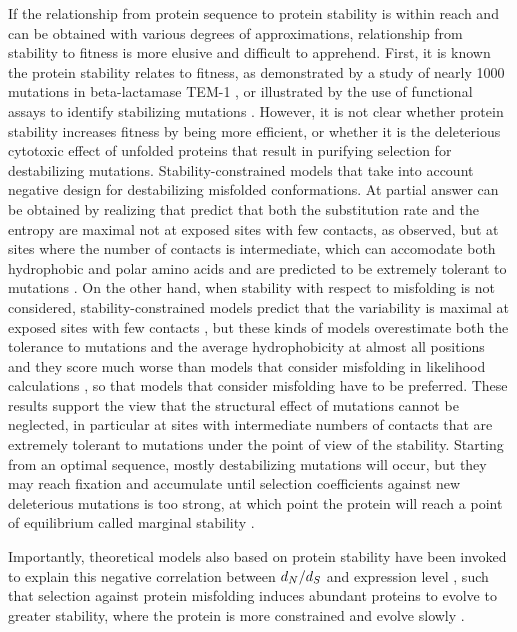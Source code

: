 If the relationship from protein sequence to protein stability is within reach and can be obtained with various degrees of approximations, relationship from stability to fitness is more elusive and difficult to apprehend.
First, it is known the protein stability relates to fitness, as demonstrated by a study of nearly 1000 mutations in beta-lactamase TEM-1 \citep{Jacquier2013}, or illustrated by the use of functional assays to identify stabilizing mutations \citep{Araya2012}.
However, it is not clear whether protein stability increases fitness by being more efficient, or whether it is the deleterious cytotoxic effect of unfolded proteins that result in purifying selection for destabilizing mutations.
Stability-constrained models that take into account negative design for destabilizing misfolded conformations.
At partial answer can be obtained by realizing that \citep{Berezovsky2007, Noivirt-Brik2009, Minning2013} predict that both the substitution rate and the entropy are maximal not at exposed sites with few contacts, as observed, but at sites where the number of contacts is intermediate, which can accomodate both hydrophobic and polar amino acids and are predicted to be extremely tolerant to mutations \citep{Jimenez2018}.
On the other hand, when stability with respect to misfolding is not considered, stability-constrained models predict that the variability is maximal at exposed sites with few contacts \citep{Scherrer2012,Echave2015}, but these kinds of models overestimate both the tolerance to mutations and the average hydrophobicity at almost all positions \citep{Jimenez2018} and they score much worse than models that consider misfolding in \gls{likelihood} calculations \citep{Arenas2015a, Arenas2017}, so that models that consider misfolding have to be preferred.
These results support the view that the structural effect of mutations cannot be neglected, in particular at sites with intermediate numbers of contacts that are extremely tolerant to mutations under the point of view of the stability.
Starting from an optimal sequence, mostly destabilizing mutations will occur, but they may reach fixation and accumulate until selection coefficients against new deleterious mutations is too strong, at which point the protein will reach a point of equilibrium called marginal stability \citep{Taverna2002, Bloom2007}.

Importantly, theoretical models also based on protein stability have been invoked to explain this negative correlation between $d_N / d_S$ and expression level \citep{Wilke2006, Drummond2008}, such that selection against protein misfolding induces abundant proteins to evolve to greater stability, where the protein is more constrained and evolve slowly \citep{Serohijos2012}.

